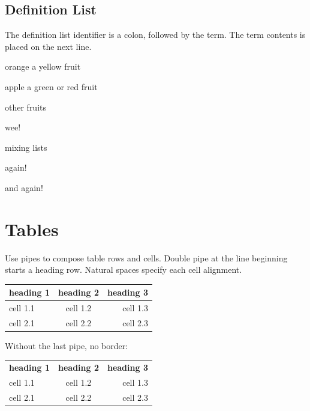 \documentclass{article}
\begin{document}
\subsection*{Definition List}

The definition list identifier is a colon, followed by
the term. The term contents is placed on the next line.

\begin{compactdesc}
\item[orange]
  a yellow fruit
\item[apple]
  a green or red fruit
\item[other fruits]
  \begin{compactitem}
  \item wee!
  \item mixing lists
    \begin{compactenum}
    \item again!
    \item and again!
    \end{compactenum}
  \end{compactitem}
\end{compactdesc}

\section*{Tables}

Use pipes to compose table rows and cells.
Double pipe at the line beginning starts a heading row.
Natural spaces specify each cell alignment.

\begin{center}\begin{tabular}{|l|c|r|}
\hline \textbf{heading 1} & \textbf{heading 2} & \textbf{heading 3} \\
\hline cell 1.1 & cell 1.2 & cell 1.3 \\
\hline cell 2.1 & cell 2.2 & cell 2.3 \\
\hline \end{tabular}\end{center}

Without the last pipe, no border:

\begin{center}\begin{tabular}{lcr}
\textbf{heading 1} & \textbf{heading 2} & \textbf{heading 3} \\
cell 1.1 & cell 1.2 & cell 1.3 \\
cell 2.1 & cell 2.2 & cell 2.3 \\
\end{tabular}\end{center}
\end{document}
